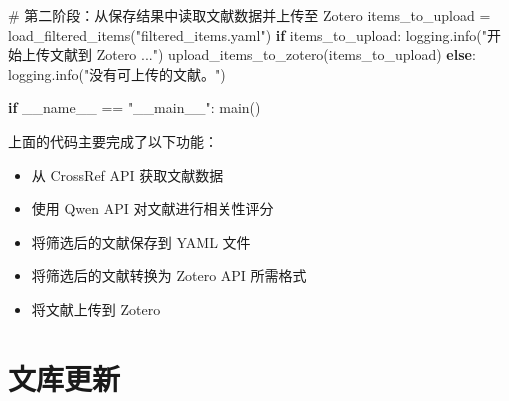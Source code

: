 \documentclass[
  letterpaper,
  DIV=11,
  numbers=noendperiod]{scrreprt}
\newenvironment{Shaded}{\begin{snugshade}}{\end{snugshade}}
\newcommand{\CommentTok}[1]{\textcolor[rgb]{0.37,0.37,0.37}{#1}}
\newcommand{\ControlFlowTok}[1]{\textcolor[rgb]{0.00,0.23,0.31}{\textbf{#1}}}
\newcommand{\NormalTok}[1]{\textcolor[rgb]{0.00,0.23,0.31}{#1}}
\newcommand{\OperatorTok}[1]{\textcolor[rgb]{0.37,0.37,0.37}{#1}}
\newcommand{\StringTok}[1]{\textcolor[rgb]{0.13,0.47,0.30}{#1}}
\newcommand{\VariableTok}[1]{\textcolor[rgb]{0.07,0.07,0.07}{#1}}
\providecommand{\tightlist}{%
  \setlength{\itemsep}{0pt}\setlength{\parskip}{0pt}}\usepackage{longtable,booktabs,array}
\begin{document}
\begin{Shaded}
\begin{Highlighting}[]
    \CommentTok{\# 第二阶段：从保存结果中读取文献数据并上传至 Zotero}
\NormalTok{    items\_to\_upload }\OperatorTok{=}\NormalTok{ load\_filtered\_items(}\StringTok{"filtered\_items.yaml"}\NormalTok{)}
    \ControlFlowTok{if}\NormalTok{ items\_to\_upload:}
\NormalTok{        logging.info(}\StringTok{"开始上传文献到 Zotero ..."}\NormalTok{)}
\NormalTok{        upload\_items\_to\_zotero(items\_to\_upload)}
    \ControlFlowTok{else}\NormalTok{:}
\NormalTok{        logging.info(}\StringTok{"没有可上传的文献。"}\NormalTok{)}

\ControlFlowTok{if} \VariableTok{\_\_name\_\_} \OperatorTok{==} \StringTok{"\_\_main\_\_"}\NormalTok{:}
\NormalTok{    main()}
\end{Highlighting}
\end{Shaded}

上面的代码主要完成了以下功能：

\begin{itemize}
\tightlist
\item
  从 CrossRef API 获取文献数据
\item
  使用 Qwen API 对文献进行相关性评分
\item
  将筛选后的文献保存到 YAML 文件
\item
  将筛选后的文献转换为 Zotero API 所需格式
\item
  将文献上传到 Zotero
\end{itemize}

\section{文库更新}\label{ux6587ux5e93ux66f4ux65b0}
\end{document}
